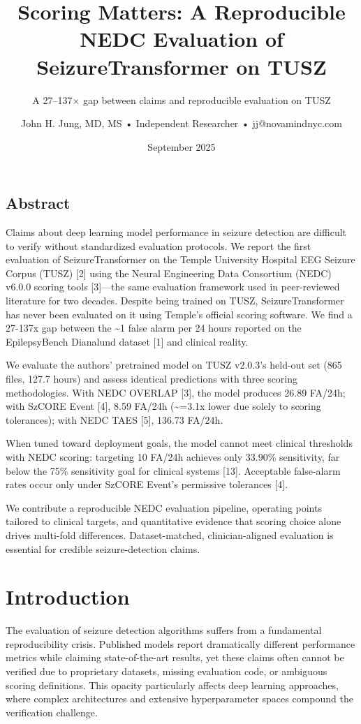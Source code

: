 \documentclass[
]{article}
\title{Scoring Matters: A Reproducible NEDC Evaluation of
SeizureTransformer on TUSZ}
\subtitle{A 27--137× gap between claims and reproducible evaluation on
TUSZ}
\author{John H. Jung, MD, MS • Independent Researcher •
jj@novamindnyc.com}
\date{September 2025}
\begin{document}
\maketitle

\hypertarget{abstract}{%
\subsection{Abstract}\label{abstract}}

Claims about deep learning model performance in seizure detection are
difficult to verify without standardized evaluation protocols. We report
the first evaluation of SeizureTransformer on the Temple University
Hospital EEG Seizure Corpus (TUSZ) {[}2{]} using the Neural Engineering
Data Consortium (NEDC) v6.0.0 scoring tools {[}3{]}---the same
evaluation framework used in peer-reviewed literature for two decades.
Despite being trained on TUSZ, SeizureTransformer has never been
evaluated on it using Temple's official scoring software. We find a
27-137x gap between the \textasciitilde1 false alarm per 24 hours
reported on the EpilepsyBench Dianalund dataset {[}1{]} and clinical
reality.

We evaluate the authors' pretrained model on TUSZ v2.0.3's held-out set
(865 files, 127.7 hours) and assess identical predictions with three
scoring methodologies. With NEDC OVERLAP {[}3{]}, the model produces
26.89 FA/24h; with SzCORE Event {[}4{]}, 8.59 FA/24h
(\textasciitilde=3.1x lower due solely to scoring tolerances); with NEDC
TAES {[}5{]}, 136.73 FA/24h.

When tuned toward deployment goals, the model cannot meet clinical
thresholds with NEDC scoring: targeting 10 FA/24h achieves only 33.90\%
sensitivity, far below the 75\% sensitivity goal for clinical systems
{[}13{]}. Acceptable false-alarm rates occur only under SzCORE Event's
permissive tolerances {[}4{]}.

We contribute a reproducible NEDC evaluation pipeline, operating points
tailored to clinical targets, and quantitative evidence that scoring
choice alone drives multi-fold differences. Dataset-matched,
clinician-aligned evaluation is essential for credible seizure-detection
claims.

\hypertarget{introduction}{%
\section{Introduction}\label{introduction}}

The evaluation of seizure detection algorithms suffers from a
fundamental reproducibility crisis. Published models report dramatically
different performance metrics while claiming state-of-the-art results,
yet these claims often cannot be verified due to proprietary datasets,
missing evaluation code, or ambiguous scoring definitions. This opacity
particularly affects deep learning approaches, where complex
architectures and extensive hyperparameter spaces compound the
verification challenge.
\end{document}
